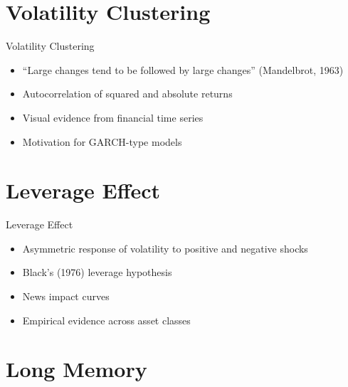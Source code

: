 \documentclass[9pt, aspectratio=169, t]{beamer}
\theoremstyle{definition}
\begin{document}
\section{Volatility Clustering}

\begin{frame}{Volatility Clustering}
    \begin{itemize}
        \item ``Large changes tend to be followed by large changes'' (Mandelbrot, 1963)
        \item Autocorrelation of squared and absolute returns
        \item Visual evidence from financial time series
        \item Motivation for GARCH-type models
    \end{itemize}
\end{frame}

\section{Leverage Effect}

\begin{frame}{Leverage Effect}
    \begin{itemize}
        \item Asymmetric response of volatility to positive and negative shocks
        \item Black's (1976) leverage hypothesis
        \item News impact curves
        \item Empirical evidence across asset classes
    \end{itemize}
\end{frame}

\section{Long Memory}
\end{document}
